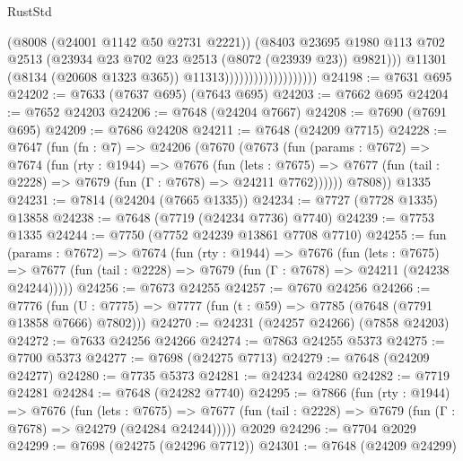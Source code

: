 \begin{lexlean}{RustStd}
\begin{coremodule}
                                            (@8008 (@24001 @1142 @50 @2731 @2221))
                                            (@8403
                                              @23695
                                              @1980
                                              @113
                                              @702
                                              @2513
                                              (@23934
                                                @23
                                                @702
                                                @23
                                                @2513
                                                (@8072 (@23939 @23))
                                                @9821)))
                                          @11301
                                          (@8134 (@20608 @1323 @365))
                                          @11313)))))))))))))))))))
@24198 := @7631 @695
@24202 := @7633 (@7637 @695) (@7643 @695)
@24203 := @7662 @695
@24204 := @7652 @24203
@24206 := @7648 (@24204 @7667)
@24208 := @7690 (@7691 @695)
@24209 := @7686 @24208
@24211 := @7648 (@24209 @7715)
@24228 := @7647
    (fun (fn : @7) =>
    @24206
      (@7670
        (@7673
          (fun (params : @7672) =>
          @7674
            (fun (rty : @1944) =>
            @7676
              (fun (lets : @7675) =>
              @7677 (fun (tail : @2228) => @7679 (fun (Γ : @7678) => @24211 @7762))))))
        @7808))
    @1335
@24231 := @7814 (@24204 (@7665 @1335))
@24234 := @7727 (@7728 @1335) @13858
@24238 := @7648 (@7719 (@24234 @7736) @7740)
@24239 := @7753 @1335
@24244 := @7750 (@7752 @24239 @13861 @7708 @7710)
@24255 := fun (params : @7672) =>
  @7674
    (fun (rty : @1944) =>
    @7676
      (fun (lets : @7675) =>
      @7677 (fun (tail : @2228) => @7679 (fun (Γ : @7678) => @24211 (@24238 @24244)))))
@24256 := @7673 @24255
@24257 := @7670 @24256
@24266 := @7776
    (fun (U : @7775) => @7777 (fun (t : @59) => @7785 (@7648 (@7791 @13858 @7666) @7802)))
@24270 := @24231 (@24257 @24266) (@7858 @24203)
@24272 := @7633 @24256 @24266
@24274 := @7863 @24255 @5373
@24275 := @7700 @5373
@24277 := @7698 (@24275 @7713)
@24279 := @7648 (@24209 @24277)
@24280 := @7735 @5373
@24281 := @24234 @24280
@24282 := @7719 @24281
@24284 := @7648 (@24282 @7740)
@24295 := @7866
    (fun (rty : @1944) =>
    @7676
      (fun (lets : @7675) =>
      @7677 (fun (tail : @2228) => @7679 (fun (Γ : @7678) => @24279 (@24284 @24244)))))
    @2029
@24296 := @7704 @2029
@24299 := @7698 (@24275 (@24296 @7712))
@24301 := @7648 (@24209 @24299)

\end{coremodule}
\end{lexlean}
